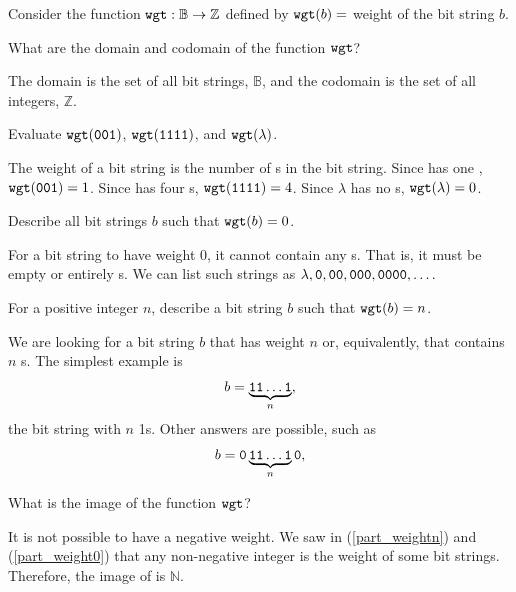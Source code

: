 \begin{exam}
\label{exam_weight_function_bit_strings}
    Consider the function $\texttt{wgt}: \mathbb{B} \to \mathbb{Z}$ defined by $\texttt{wgt}(b) =$ weight of the bit string $b$.
        \begin{apart}
            \item What are the domain and codomain of the function $\texttt{wgt}$?
                \begin{soln}
                    The domain is the set of all bit strings, $\mathbb{B}$, and the codomain is the set of all integers, $\mathbb{Z}$.
                \end{soln}
            \item Evaluate $\texttt{wgt}(\texttt{001})$, $\texttt{wgt}(\texttt{1111})$, and $\texttt{wgt}(\lambda)$.
                \begin{soln}
                    The weight of a bit string is the number of s in the bit string.  Since  has one , $\texttt{wgt}(\texttt{001})=1$.  Since  has four s, $\texttt{wgt}(\texttt{1111})=4$.  Since $\lambda$ has no s, $\texttt{wgt}(\lambda)=0$.
                \end{soln}
            
            \item \label{part_weight0}
            Describe all bit strings $b$ such that $\texttt{wgt}(b)=0$.
                \begin{soln}
                    For a bit string to have weight 0, it cannot contain any s. That is, it must be empty or entirely s. We can list such strings as $\lambda, \texttt{0}, \texttt{00}, \texttt{000},  \texttt{0000}, \ldots.$
                \end{soln}
            \item \label{part_weightn} 
            For a positive integer $n$, describe a bit string $b$ such that $\texttt{wgt}(b) = n$.
                \begin{soln}
                    We are looking for a bit string $b$ that has weight $n$ or, equivalently, that contains $n$ s.  The simplest example is $$b = \underbrace{\texttt{11}\ldots\texttt{1}}_{n},$$
                    the bit string with $n$ 1s.  Other answers are possible, such as $$b = \texttt{0}\underbrace{\texttt{11}\ldots\texttt{1}}_{n }\texttt{0},$$ 
                \end{soln}
            \item What is the image of the function $\texttt{wgt}$?
                \begin{soln}
                    It is not possible to have a negative weight.  We saw in (\ref{part_weightn}) and (\ref{part_weight0}) that any non-negative integer is the weight of some bit strings.  Therefore, the image of  is $\mathbb{N}$.
                \end{soln}
        \end{apart}   
\end{exam}

